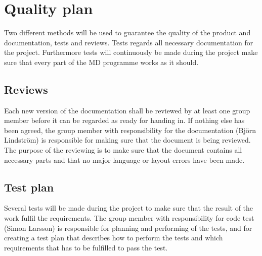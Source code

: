 \section{Quality plan}
Two different methods will be used to guarantee the quality of the product and documentation, tests and reviews. Tests regards all necessary documentation for the project. Furthermore tests will continuously be made during the project make sure that every part of the MD programme works as it should.

\subsection{Reviews}

Each new version of the documentation shall be reviewed by at least one group member before it can be regarded as ready for handing in. If nothing else has been agreed, the group member with responsibility for the documentation (Björn Lindström) is responsible for making sure that the document is being reviewed. The purpose of the reviewing is to make sure that the document contains all necessary parts and that no major language or layout errors have been made.

\subsection{Test plan}

Several tests will be made during the project to make sure that the result of the work fulfil the requirements. The group member with responsibility for code test (Simon Larsson) is responsible for planning and performing of the tests, and for creating a test plan that describes how to perform the tests and which requirements that has to be fulfilled to pass the test.


